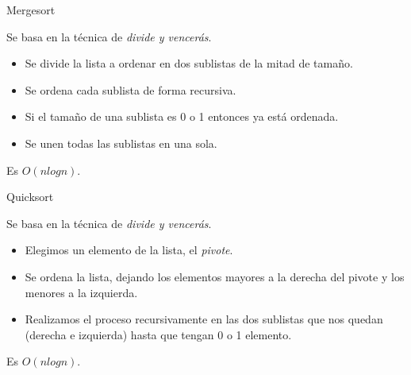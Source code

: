 \documentclass[spanish]{beamer}
\begin{document}
\begin{frame}
	\begin{center}
		
	\end{center}
\end{frame}

\begin{frame}{Mergesort}

	Se basa en la técnica de \textit{divide y vencerás}.

	\vskip 0.5cm
	
	\begin{itemize}
		\item Se divide la lista a ordenar en dos sublistas de la mitad de tamaño.
		\item Se ordena cada sublista de forma recursiva.
		\item Si el tamaño de una sublista es 0 o 1 entonces ya está ordenada.
		\item Se unen todas las sublistas en una sola.
	\end{itemize}
	
	\vskip 0.5cm
	
	Es $O(nlogn)$.
\end{frame}

\begin{frame}
	\begin{center}
		
	\end{center}
\end{frame}

\begin{frame}{Quicksort}

	Se basa en la técnica de \textit{divide y vencerás}.

	\vskip 0.5cm
	
	\begin{itemize}
		\item Elegimos un elemento de la lista, el \textit{pivote}.
		\item Se ordena la lista, dejando los elementos mayores a la derecha del pivote y los menores a la izquierda.
		\item Realizamos el proceso recursivamente en las dos sublistas que nos quedan (derecha e izquierda) hasta que tengan 0 o 1 elemento.
	\end{itemize}
	
	\vskip 0.5cm
	
	Es $O(nlogn)$.
\end{frame}

\begin{frame}
	\begin{center}
		
	\end{center}
\end{frame}
\end{document}
